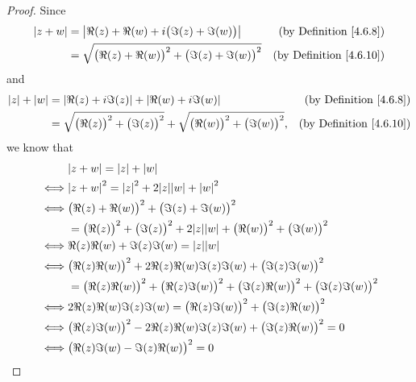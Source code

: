 \begin{proof}
    Since
    \begin{align*}
        \left\lvert z + w\right\rvert & = \left\lvert\Re(z) + \Re(w) + i \big(\Im(z) + \Im(w)\big)\right\rvert              & \text{(by Definition \ref{4.6.8})}  \\
                    & = \sqrt{\big(\Re(z) + \Re(w)\big)^2 + \big(\Im(z) + \Im(w)\big)^2} & \text{(by Definition \ref{4.6.10})}
    \end{align*}
    and
    \begin{align*}
        \left\lvert z\right\rvert + \left\lvert w\right\rvert & = \left\lvert\Re(z) + i \Im(z)\right\rvert + \left\lvert\Re(w) + i \Im(w)\right\rvert                                                & \text{(by Definition \ref{4.6.8})}  \\
                          & = \sqrt{\big(\Re(z)\big)^2 + \big(\Im(z)\big)^2} + \sqrt{\big(\Re(w)\big)^2 + \big(\Im(w)\big)^2}, & \text{(by Definition \ref{4.6.10})}
    \end{align*}
    we know that
    \begin{align*}
             & \abs{z + w} = \abs{z} + \abs{w}                                                                                 \\
        \iff & \abs{z + w}^2 = \abs{z}^2 + 2 \abs{z} \abs{w} + \abs{w}^2                                                       \\
        \iff & \big(\Re(z) + \Re(w)\big)^2 + \big(\Im(z) + \Im(w)\big)^2                                                       \\
             & = \big(\Re(z)\big)^2 + \big(\Im(z)\big)^2 + 2 \abs{z} \abs{w} + \big(\Re(w)\big)^2 + \big(\Im(w)\big)^2         \\
        \iff & \Re(z) \Re(w) + \Im(z) \Im(w) = \abs{z} \abs{w}                                                                 \\
        \iff & \big(\Re(z) \Re(w)\big)^2 + 2 \Re(z) \Re(w) \Im(z) \Im(w) + \big(\Im(z) \Im(w)\big)^2                           \\
             & = \big(\Re(z) \Re(w)\big)^2 + \big(\Re(z) \Im(w)\big)^2 + \big(\Im(z) \Re(w)\big)^2 + \big(\Im(z) \Im(w)\big)^2 \\
        \iff & 2 \Re(z) \Re(w) \Im(z) \Im(w) = \big(\Re(z) \Im(w)\big)^2 + \big(\Im(z) \Re(w)\big)^2                           \\
        \iff & \big(\Re(z) \Im(w)\big)^2 - 2 \Re(z) \Re(w) \Im(z) \Im(w) + \big(\Im(z) \Re(w)\big)^2 = 0                       \\
        \iff & \big(\Re(z) \Im(w) - \Im(z) \Re(w)\big)^2 = 0                                                                   \\

\end{align*}
\end{proof}
